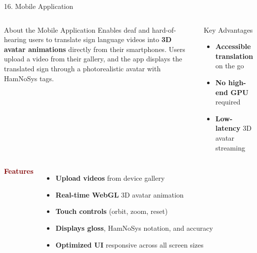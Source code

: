\documentclass[aspectratio=169]{beamer}
\begin{document}
\begin{frame}[t]{16. Mobile Application}
\vspace{-0.1cm}

\begin{columns}[T]
\begin{block}{About the Mobile Application}
\fontsize{6.8pt}{8.8pt}\selectfont
Enables deaf and hard-of-hearing users to translate sign language videos into \textbf{3D avatar animations} directly from their smartphones. Users upload a video from their gallery, and the app displays the translated sign through a photorealistic avatar with HamNoSys tags.
\end{block}

\begin{block}{Key Advantages}
\fontsize{6.8pt}{8.8pt}\selectfont
\begin{itemize}\setlength{\itemsep}{0.08cm}
\item[\textcolor{green!50!black}{\checkmark}] \textbf{Accessible translation} on the go
\item[\textcolor{green!50!black}{\checkmark}] \textbf{No high-end GPU} required
\item[\textcolor{green!50!black}{\checkmark}] \textbf{Low-latency} 3D avatar streaming
\end{itemize}
\end{block}
\end{columns}

\vspace{0.22cm}

\begin{columns}[T]
\textbf{\textcolor{maroon}{\footnotesize Features}}
\vspace{0.06cm}
{\fontsize{6.7pt}{8.7pt}\selectfont
\begin{itemize}\setlength{\itemsep}{0.08cm}
\item \textbf{Upload videos} from device gallery
\item \textbf{Real-time WebGL} 3D avatar animation
\item \textbf{Touch controls} (orbit, zoom, reset)
\item \textbf{Displays gloss}, HamNoSys notation, and accuracy
\item \textbf{Optimized UI} responsive across all screen sizes
\end{itemize}
}


\end{columns}
\end{frame}
\end{document}
